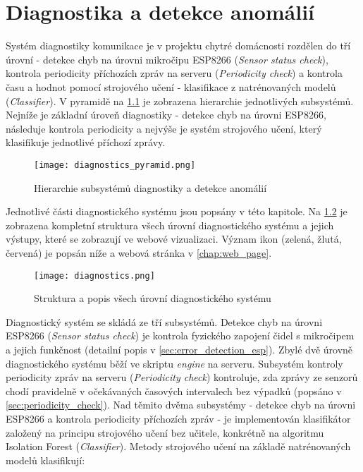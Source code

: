 \chapter{Diagnostika a detekce anomálií} \label{chap:diagnostics}
Systém diagnostiky komunikace je v projektu chytré domácnosti rozdělen do tří úrovní - detekce chyb na úrovni mikročipu ESP8266 (\textit{Sensor status check}), kontrola periodicity příchozích zpráv na serveru (\textit{Periodicity check}) a kontrola času a hodnot pomocí strojového učení - klasifikace z natrénovaných modelů (\textit{Classifier}). V pyramidě na \cref{fig:diagnostics_pyramid} je zobrazena hierarchie jednotlivých subsystémů. Nejníže je základní úroveň diagnostiky - detekce chyb na úrovni ESP8266, následuje kontrola periodicity a nejvýše je systém strojového učení, který klasifikuje jednotlivé příchozí zprávy.  

\begin{figure}[H]
  \centering
  \texttt{[image: diagnostics\_pyramid.png]}
  \caption{Hierarchie subsystémů diagnostiky a detekce anomálií}
  \label{fig:diagnostics_pyramid}
\end{figure}  

Jednotlivé části diagnostického systému jsou popsány v této kapitole. Na \cref{fig:diagnostics} je zobrazena kompletní struktura všech úrovní diagnostického systému a jejich výstupy, které se zobrazují ve webové vizualizaci. Význam ikon (zelená, žlutá, červená) je popsán níže a webová stránka v \cref{chap:web_page}. 

\begin{figure}[H]
  \centering
  \texttt{[image: diagnostics.png]}
  \caption{Struktura a popis všech úrovní diagnostického systému}
  \label{fig:diagnostics}
\end{figure}  

Diagnostický systém se skládá ze tří subsystémů. Detekce chyb na úrovni ESP8266 (\textit{Sensor status check}) je kontrola fyzického zapojení čidel s mikročipem a jejich funkčnost (detailní popis v \cref{sec:error_detection_esp}). Zbylé dvě úrovně diagnostického systému běží ve skriptu \textit{engine} na serveru. Subsystém kontroly periodicity zpráv na serveru (\textit{Periodicity check}) kontroluje, zda zprávy ze senzorů chodí pravidelně v očekávaných časových intervalech bez výpadků (popsáno v \cref{sec:periodicity_check}). Nad těmito dvěma subsystémy - detekce chyb na úrovni ESP8266 a kontrola periodicity příchozích zpráv - je implementován klasifikátor založený na principu strojového učení bez učitele, konkrétně na algoritmu Isolation Forest (\textit{Classifier}). Metody strojového učení na základě natrénovaných modelů klasifikují:

